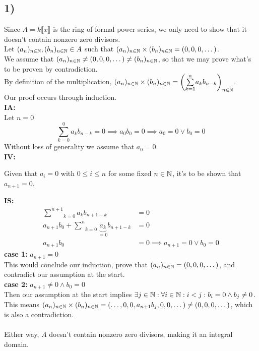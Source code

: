 \documentclass[a4paper]{scrartcl}
\begin{document}
\subsection*{1)}
Since $A=k\llbracket x\rrbracket$ is the ring of formal power series, we only need to show that it doesn't contain nonzero zero divisors.\\
Let $(a_n)_{n\in\mathbb{N}},(b_n)_{n\in\mathbb{N}}\in A$ such that $(a_n)_{n\in\mathbb{N}}\times(b_n)_{n\in\mathbb{N}}=(0,0,0,\dots)$.\\
We assume that $(a_n)_{n\in\mathbb{N}}\neq(0,0,0,\dots)\neq(b_n)_{n\in\mathbb{N}}$, so that we may prove what's to be proven by contradiction.\\
By definition of the multiplication, $(a_n)_{n\in\mathbb{N}}\times(b_n)_{n\in\mathbb{N}}=\left( \underset{k=1}{\overset{n}{\sum}}a_kb_{n-k} \right)_{n\in\mathbb{N}}$.\\
Our proof occurs through induction.\\
\textbf{IA:}\\
Let $n=0$
\[\underset{k=0}{\overset{0}{\sum}}a_kb_{n-k}=0\implies a_0b_0=0\implies a_0=0\vee b_0=0\]
Without loss of generality we assume that $a_0=0$.\\
\textbf{IV:}
\begin{center}
    Given that $a_i=0$ with $0\leq i\leq n$ for some fixed $n\in\mathbb{N}$, it's to be shown that $a_{n+1}=0$.
\end{center}
\textbf{IS:}
\begin{align*}
    \underset{k=0}{\overset{n+1}{\sum}}a_kb_{n+1-k}&=0\\
    a_{n+1}b_0+\underset{k=0}{\overset{n}{\sum}}\underbrace{a_k}_{=0}b_{n+1-k}&=0\\
    a_{n+1}b_0&=0\implies a_{n+1}=0\vee b_0=0
\end{align*}
\textbf{case 1:} $a_{n+1}=0$\\
This would conclude our induction, prove that $(a_n)_{n\in\mathbb{N}}=(0,0,0,\dots)$, and contradict our assumption at the start.\\
\textbf{case 2:} $a_{n+1}\neq0\wedge b_0=0$\\
Then our assumption at the start implies $\exists j\in\mathbb{N}:\forall i\in\mathbb{N}:i<j:b_i=0\wedge b_j\neq0$.\\
This means $(a_n)_{n\in\mathbb{N}}\times(b_n)_{n\in\mathbb{N}}=(\dots,0,0,a_{n+1}b_j,0,0,\dots)\neq(0,0,0,\dots)$, which is also a contradiction.\\ \\
Either way, $A$ doesn't contain nonzero zero divisors, making it an integral domain.
\end{document}
